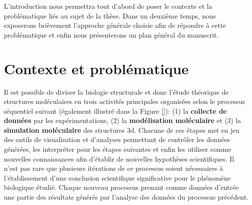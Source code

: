 

L'introduction nous permettra tout d'abord de poser le contexte et la problématique liés au sujet de la thèse. Dans un deuxième temps, nous exposerons brièvement l'approche générale choisie afin de répondre à cette problématique et enfin nous présenterons un plan général du manuscrit.

\section*{Contexte et problématique}

Il est possible de diviser la biologie structurale et donc l'étude théorique de structures moléculaires en trois activités principales organisées selon le processus séquentiel suivant (également illustré dans la Figure \ref{}): (1) la \textbf{collecte de données} par les expérimentations, (2) la \textbf{modélisation moléculaire} et (3) la \textbf{simulation moléculaire} des structures 3d. Chacune de ces étapes met en jeu des outils de visualisation et d'analyses permettant de contrôler les données générées, les interpréter pour les étapes suivantes et enfin les utiliser comme nouvelles connaissances afin d'établir de nouvelles hypothèses scientifiques. Il n'est pas rare que plusieurs itérations de ce processus soient nécessaires à l'établissement d'une conclusion scientifique significative pour le phénomène biologique étudié. Chaque nouveau processus prenant comme données d'entrée une partie des résultats générés par l'analyse des données du processus précédent.

